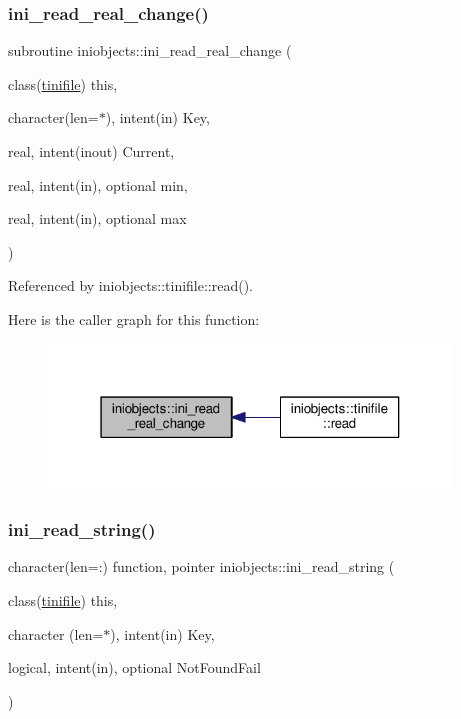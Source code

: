 \subsubsection{\texorpdfstring{ini\+\_\+read\+\_\+real\+\_\+change()}{ini\_read\_real\_change()}}
{\footnotesize\ttfamily subroutine iniobjects\+::ini\+\_\+read\+\_\+real\+\_\+change (\begin{DoxyParamCaption}\item[{class(\mbox{\hyperlink{structiniobjects_1_1tinifile}{tinifile}})}]{this,  }\item[{character(len=$\ast$), intent(in)}]{Key,  }\item[{real, intent(inout)}]{Current,  }\item[{real, intent(in), optional}]{min,  }\item[{real, intent(in), optional}]{max }\end{DoxyParamCaption})\hspace{0.3cm}{\ttfamily [private]}}



Referenced by iniobjects\+::tinifile\+::read().

Here is the caller graph for this function\+:
\nopagebreak
\begin{figure}[H]
\begin{center}
\leavevmode
\includegraphics[width=304pt]{namespaceiniobjects_ab840810b30c65a67b6834782fe064f34_icgraph}
\end{center}
\end{figure}
\mbox{\label{namespaceiniobjects_af8362fa0f894e89d84f084ec08dca575}} 
\subsubsection{\texorpdfstring{ini\+\_\+read\+\_\+string()}{ini\_read\_string()}}
{\footnotesize\ttfamily character(len=\+:) function, pointer iniobjects\+::ini\+\_\+read\+\_\+string (\begin{DoxyParamCaption}\item[{class(\mbox{\hyperlink{structiniobjects_1_1tinifile}{tinifile}})}]{this,  }\item[{character (len=$\ast$), intent(in)}]{Key,  }\item[{logical, intent(in), optional}]{Not\+Found\+Fail }\end{DoxyParamCaption})\hspace{0.3cm}{\ttfamily [private]}}

